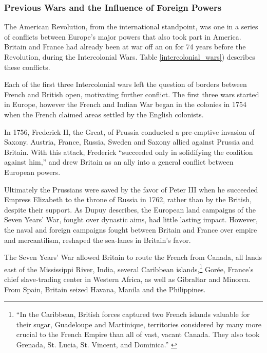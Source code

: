 \subsubsection{Previous Wars and the Influence of Foreign Powers}

The American Revolution, from the international standpoint, was one in a series
of conflicts between Europe's major powers that also took part in America.
Britain and France had already been at war off an on for 74 years before
the Revolution, during the Intercolonial Wars. Table \ref{intercolonial_wars})
describes these conflicts.



Each of the first three Intercolonial wars left the question of borders between
French and British open, motivating further conflict. The first three wars
started in Europe, however the French and Indian War began in the colonies in
1754 when the French claimed areas settled by the English colonists.

In 1756, Frederick II, the Great, of Prussia conducted a pre-emptive invasion of
Saxony. Austria, France, Russia, Sweden and Saxony allied against Prussia and
Britain. With this attack, Frederick ``succeeded only in solidifying the
coalition against him,''\cite{dupuy_1977} and drew Britain as an ally into a
general conflict between European powers. 

Ultimately the Prussians were saved by the favor of Peter III when he succeeded
Empress Elizabeth to the throne of Russia in 1762, rather than by the British,
despite their support. As Dupuy describes, the European land campaigns of
the Seven Years' War, fought over dynastic aims, had little lasting impact.
However, the naval and foreign campaigns fought between Britain and France over
empire and mercantilism, reshaped the sea-lanes in Britain's favor.

The Seven Years' War allowed Britain to route the French from
Canada, all lands east of the Mississippi River, India, several Caribbean
islands,\footnote{``In the Caribbean, British forces captured two French islands
valuable for their sugar, Guadeloupe and Martinique, territories considered by
many more crucial to the French Empire than all of vast, vacant Canada. They
also took Grenada, St. Lucia, St. Vincent, and Dominica.'' \cite[8]{dupuy_1977}}
Gor\'ee, France's chief slave-trading center in Western Africa, as well as
Gibraltar and Minorca.\cite[7-9]{dupuy_1977} From Spain, Britain seized Havana,
Manila and the Philippines.

